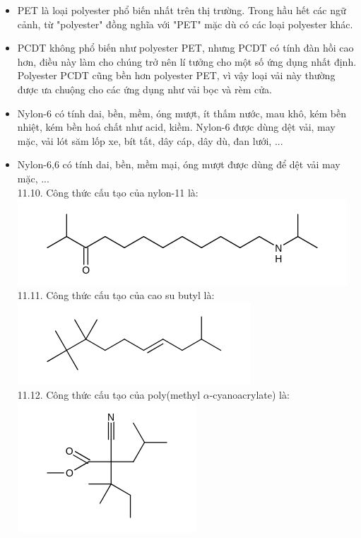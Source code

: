 \documentclass[10pt]{article}
\begin{document}
\begin{itemize}
  \item PET là loại polyester phổ biến nhất trên thị trường. Trong hầu hết các ngữ cảnh, từ "polyester" đồng nghĩa với "PET" mặc dù có các loại polyester khác.
  \item PCDT không phổ biến như polyester PET, nhưng PCDT có tính đàn hồi cao hơn, điều này làm cho chúng trở nên lí tưởng cho một số ứng dụng nhất định. Polyester PCDT cũng bền hơn polyester PET, vì vậy loại vải này thường được ưa chuộng cho các ứng dụng như vải bọc và rèm cửa.
  \item Nylon-6 có tính dai, bền, mềm, óng mượt, ít thấm nước, mau khô, kém bền nhiệt, kém bền hoá chất như acid, kiềm. Nylon-6 được dùng dệt vải, may mặc, vải lót săm lốp xe, bít tất, dây cáp, dây dù, đan lưới, ...
  \item Nylon-6,6 có tính dai, bền, mềm mại, óng mượt được dùng để dệt vải may mặc, ...\\
11.10. Công thức cấu tạo của nylon-11 là:\\
\includegraphics{smile-43b3cee38854237e1d07a84147c9482447fd6e75}\\
11.11. Công thức cấu tạo của cao su butyl là:\\
\includegraphics{smile-50cc04abd29df310542ef915a95e560c6bf01235}\\
11.12. Công thức cấu tạo của poly(methyl $\alpha$-cyanoacrylate) là:\\
\includegraphics{smile-cd90071acbae7ca4fededec5d66bb9946d98f18d}\\

\end{itemize}
\end{document}
